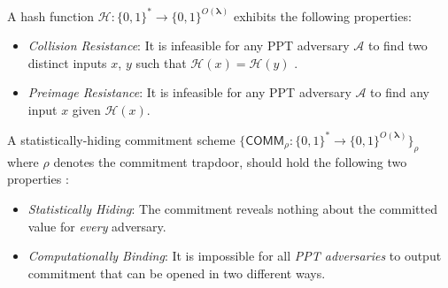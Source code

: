 \begin{definition}
	\label{def:Collision-resistance hash function}
	A hash function $\mathcal{H}: \{0, 1\}^\ast \rightarrow \{0,1\}^{O(\boldsymbol{\lambda})}$ exhibits the following properties:
	\begin{itemize}
		\item \textit{Collision Resistance}: It is infeasible for any PPT adversary $\mathcal{A}$ to find two distinct inputs $x$, $y$ such that $\mathcal{H}(x) = \mathcal{H}(y)$  \cite{katz2020introduction}.
		\item \textit{Preimage Resistance}: It is infeasible for any PPT adversary $\mathcal{A}$ to find any input $x$ given $\mathcal{H}(x)$.
	\end{itemize} 
\end{definition}

\begin{definition}
	\label{def:Statistically-hiding commitment}
	A statistically-hiding commitment scheme  $\{\mathsf{COMM}_\rho:\{0,1\}^* \rightarrow \{0, 1\}^{O(\boldsymbol{\lambda})} \}_\rho$ \cite{zcash-proc} where $\rho$ denotes the commitment trapdoor, should hold the following two properties \cite{katz2020introduction, zcash-proc}:
	\begin{itemize}
		\item \textit{Statistically Hiding}: The commitment reveals nothing about the committed value for \textit{every} adversary. 
		\item \textit{Computationally Binding}: It is impossible for all \textit{PPT adversaries} to output commitment that can be opened in two different ways.
	\end{itemize}
\end{definition}

%	

